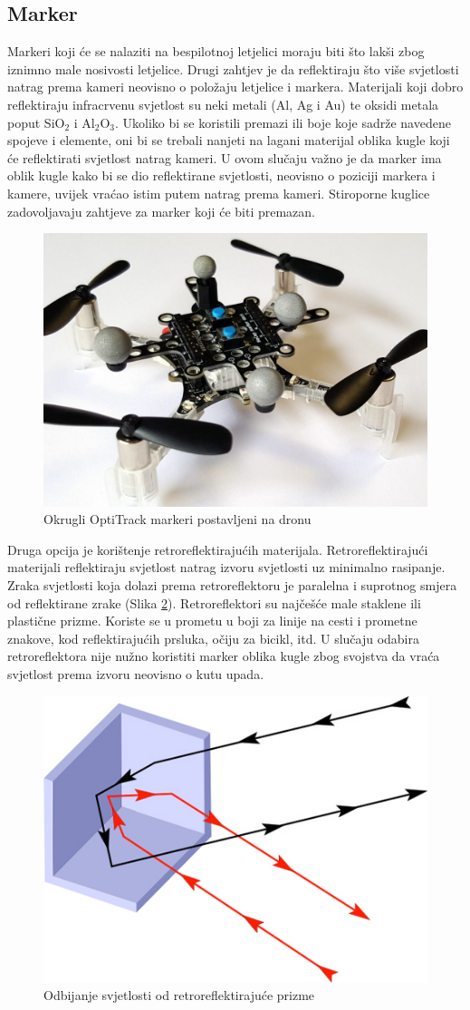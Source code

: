 \documentclass[times, utf8, diplomski]{fer}
\begin{document}
\subsection{Marker}
Markeri koji će se nalaziti na bespilotnoj letjelici moraju biti što lakši zbog iznimno male nosivosti letjelice. Drugi zahtjev je da reflektiraju što više svjetlosti natrag prema kameri neovisno o položaju letjelice i markera. Materijali koji dobro reflektiraju infracrvenu svjetlost su neki metali (Al, Ag i Au) te oksidi metala poput SiO$_2$ i Al$_2$O$_3$. Ukoliko bi se koristili premazi ili boje koje sadrže navedene spojeve i elemente, oni bi se trebali nanjeti na lagani materijal oblika kugle koji će reflektirati svjetlost natrag kameri. U ovom slučaju važno je da marker ima oblik kugle kako bi se dio reflektirane svjetlosti, neovisno o poziciji markera i kamere, uvijek vraćao istim putem natrag prema kameri. Stiroporne kuglice zadovoljavaju zahtjeve za marker koji će biti premazan.

\begin{figure}[h]
\centering
\includegraphics[width=.5\textwidth]{markers_dron}
\caption{Okrugli OptiTrack markeri postavljeni na dronu}
\label{fig:opti_markers}
\end{figure}

Druga opcija je korištenje retroreflektirajućih materijala. Retroreflektirajući materijali reflektiraju svjetlost natrag izvoru svjetlosti uz minimalno rasipanje. Zraka svjetlosti koja dolazi prema retroreflektoru je paralelna i suprotnog smjera od reflektirane zrake (Slika \ref{fig:retrorefleksija}). Retroreflektori su najčešće male staklene ili plastične prizme. Koriste se u prometu u boji za linije na cesti i prometne znakove, kod reflektirajućih prsluka,  očiju za bicikl, itd. U slučaju odabira retroreflektora nije nužno koristiti marker oblika kugle zbog svojstva da vraća svjetlost prema izvoru neovisno o kutu upada.

\begin{figure}[h]
\centering
\includegraphics[width=.4\textwidth]{retroreflector}
\caption{Odbijanje svjetlosti od retroreflektirajuće prizme}
\label{fig:retrorefleksija}
\end{figure}
\end{document}

